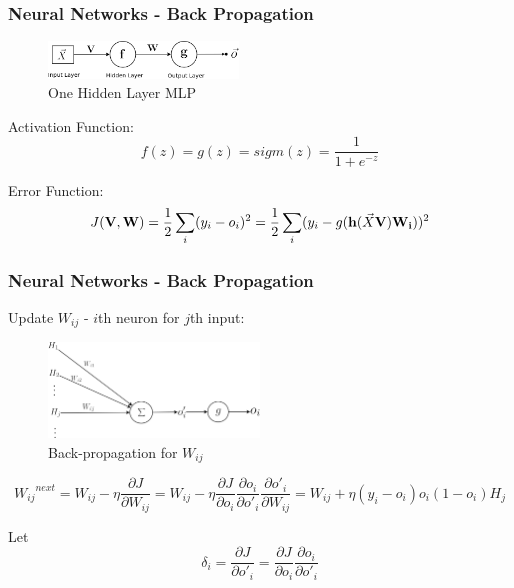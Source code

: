 \documentclass{beamer}
\begin{document}
\begin{frame}
\frametitle{Neural Networks - Back Propagation}
\begin{figure}[t!]
    \centering
    \includegraphics[width=0.45\textwidth]{../paper/pictures/figures/MLP.png}
    \caption{One Hidden Layer MLP}
    \label{fig:MLP}
\end{figure}

Activation Function:
$$f(z)=g(z)=sigm(z)=\frac{1}{1+e^{-z}}$$

Error Function:
$$J(\bold{V}, \bold{W}) = \frac{1}{2}\sum_{i}(y_i-o_i)^2 =\frac{1}{2}\sum_{i}(y_i-g(\bold{h}(\vec{X}\bold{V})\bold{W_i}))^2$$

\end{frame}

\begin{frame}
\frametitle{Neural Networks - Back Propagation}
Update $W_{ij}$ - $i$th neuron for $j$th input:
\begin{figure}[t!]
    \centering
    \includegraphics[width=0.5\textwidth]{../paper/pictures/figures/BP1.png}
    \caption{Back-propagation for $W_{ij}$}
    \label{fig:BP1}
\end{figure}

$$
{{W_{ij}}^{next}}
= W_{ij} - \eta\frac{\partial J}{\partial W_{ij}}
= W_{ij} - \eta\frac{\partial J}{\partial o_i}\frac{\partial o_i}{\partial o'_i}\frac{\partial o'_i}{\partial W_{ij}}
= W_{ij} + \eta(y_i-o_i)o_i(1-o_i)H_j
$$

Let
$$
\delta_i
= \frac{\partial J}{\partial o'_i}
= \frac{\partial J}{\partial o_i}\frac{\partial o_i}{\partial o'_i}
$$
\end{frame}
\end{document}
